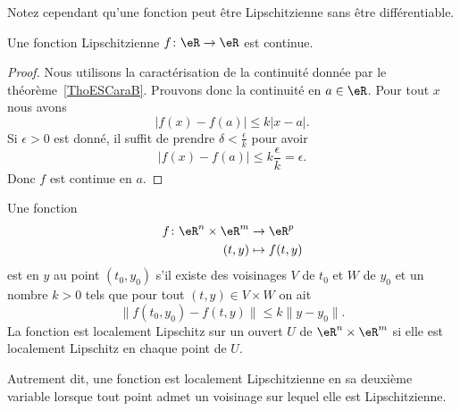 Notez cependant qu'une fonction peut être Lipschitzienne sans être différentiable.

\begin{proposition} \label{PropFZgFTEW}
    Une fonction Lipschitzienne \( f\colon \eR\to \eR\) est continue.
\end{proposition}

\begin{proof}
    Nous utilisons la caractérisation de la continuité donnée par le théorème~\ref{ThoESCaraB}. Prouvons donc la continuité en \( a\in \eR\). Pour tout \( x\) nous avons
    \begin{equation}
        \big| f(x)-f(a) \big|\leq k| x-a |.
    \end{equation}
    Si \( \epsilon>0\) est donné, il suffit de prendre \( \delta<\frac{ \epsilon }{ k }\) pour avoir
    \begin{equation}
        \big| f(x)-f(a) \big|\leq k\frac{ \epsilon }{ k }=\epsilon.
    \end{equation}
    Donc \( f\) est continue en \( a\).
\end{proof}

\begin{definition}      \label{DefJSFFooEOCogV}
    Une fonction
    \begin{equation}
        \begin{aligned}
            f\colon \eR^n\times \eR^m&\to \eR^p \\
            (t,y)&\mapsto f(t,y)
        \end{aligned}
    \end{equation}
    est  en \( y\) au point \( (t_0,y_0)\) s'il existe des voisinages \( V\) de \( t_0\) et \( W\) de \( y_0\) et un nombre \( k>0\) tels que pour tout \( (t,y)\in V\times W\) on ait
    \begin{equation}
        \big\| f(t_0,y_0)-f(t,y) \big\|\leq k\| y-y_0 \|.
    \end{equation}
    La fonction est localement Lipschitz sur un ouvert \( U\) de \( \eR^n\times \eR^m\) si elle est localement Lipschitz en chaque point de \( U\).
\end{definition}

\begin{normaltext}      \label{NORMooYNRAooBgobcK}
    Autrement dit, une fonction est localement Lipschitzienne en sa deuxième variable lorsque tout point admet un voisinage sur lequel elle est Lipschitzienne.
\end{normaltext}

